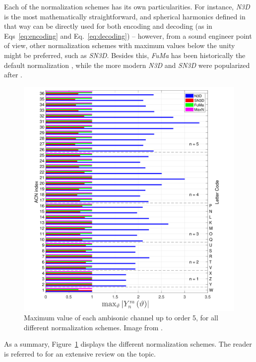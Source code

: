 Each of the normalization schemes has its own particularities. For instance, \textit{N3D} is the most mathematically straightforward, and spherical harmonics defined in that way can be directly used for both encoding and decoding (as in Eqs~\ref{eq:encoding} and Eq.~\ref{eq:decoding}) -- however, from a sound engineer point of view, other normalization schemes with maximum values below the unity might be preferred, such as \textit{SN3D}. Besides this, \textit{FuMa} has been historically the default normalization \cite{gerzon1985ambisonics}, while the more modern \textit{N3D} and \textit{SN3D} were popularized after \cite{daniel2000representation}. \\

\begin{figure}[hbt!]
  \includegraphics[width=\textwidth]{Figures/ScientificBackground/normalization.png}
  \caption{Maximum value of each ambisonic channel up to order 5, for all different normalization schemes. Image from \cite{carpentier2017ambisonic}.}
  \label{fig:normalization}
\end{figure}


As a summary, Figure~\ref{fig:normalization} displays the different normalization schemes. The reader is referred to \cite{carpentier2017ambisonic} for an extensive review on the topic.



